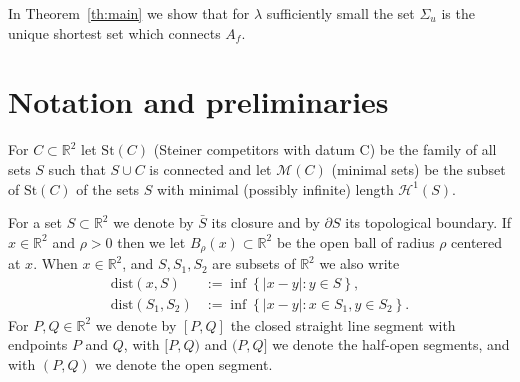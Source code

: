\documentclass{amsart}
\newcommand{\RR}{\mathbb R}
\newcommand{\CC}{\mathbb C}
\newcommand{\NN}{\mathbb N}
\renewcommand{\H}{\mathcal H}
\newcommand{\abs}[1]{\left\vert #1 \right\vert}
\newcommand{\ENCLOSE}[1]{\left\{#1\right\}}
\newcommand{\St}{\mathrm{St}}
\newcommand{\M}{\mathcal{M}}
\renewcommand{\H}{\mathcal{H}}
\newcommand{\dist}{\mathrm{dist}}
\theoremstyle{definition}
\theoremstyle{remark}
\begin{document}
In Theorem~\ref{th:main} we show that for $\lambda$ sufficiently small the set $\Sigma_u$ 
is the unique shortest set which connects $A_f$.


% 
\section{Notation and preliminaries}

For $C\subset \RR^2$ let $\St(C)$ (Steiner competitors with datum C) be the family of all sets $S$ such that 
$S\cup C$ is connected and 
let $\M(C)$ (minimal sets) be the subset of $\St(C)$ of the sets $S$ 
with minimal (possibly infinite) length $\H^1(S)$.

For a set $S\subset \RR^2$ we denote by $\bar S$ 
its closure and by $\partial S$ its topological boundary.
If $x\in \RR^2$ and $\rho>0$ then we let $B_\rho(x)\subset \RR^2$ 
be the open ball of radius 
$\rho$ centered at $x$.
When $x\in \RR^2$, and $S,S_1,S_2$ are subsets of $\RR^2$
we also write
\begin{align*}
  \dist(x,S)
    &:=\inf\ENCLOSE{\abs{x-y}:y\in S},\\
  \dist(S_1,S_2) 
    &:= \inf\ENCLOSE{\abs{x-y}\colon x\in S_1, y\in S_2}.
\end{align*}
For $P,Q\in \RR^2$ we denote by $[P,Q]$ the closed straight line 
segment with endpoints $P$ and $Q$, with $[P,Q)$ and $(P,Q]$ 
we denote the half-open segments, and with $(P,Q)$ we denote 
the open segment.
\end{document}
